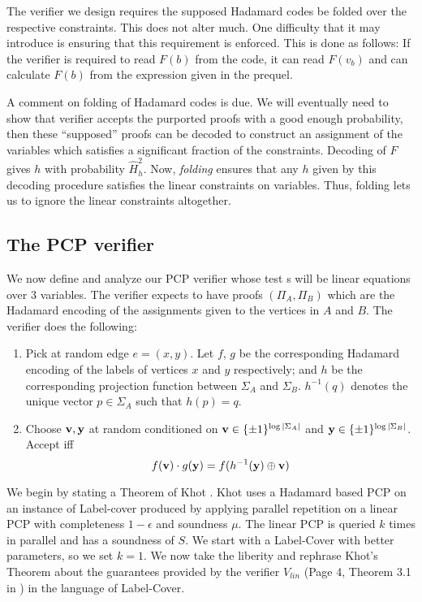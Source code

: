 The verifier we design requires the supposed Hadamard codes be folded
over the respective constraints. This does not alter much. One
difficulty that it may introduce is ensuring that this requirement is
enforced.  This is done as follows: If the verifier is required to
read $F(b)$ from the code, it can read $F(v_b)$ and can calculate
$F(b)$ from the expression given in the prequel.

A comment on folding of Hadamard codes is due. We will eventually need
to show that verifier accepts the purported proofs with a good enough
probability, then these ``supposed'' proofs can be decoded to
construct an assignment of the variables which satisfies a significant
fraction of the constraints. Decoding of $F$ gives $h$ with
probability $\widehat{H}^2_h$. Now, {\em folding} ensures that any $h$
given by this decoding procedure satisfies the linear constraints on
variables. Thus, folding lets us to ignore the linear constraints 
altogether.

\subsection{The PCP verifier}
We now define and analyze our PCP verifier whose test
s will be linear equations over $3$ 
variables. The verifier expects to have
proofs $(\Pi_A, \Pi_B)$ which are the Hadamard encoding of the assignments
given to the vertices in $A$ and $B$. The verifier does the following:
\begin{enumerate}
\item Pick at random edge $e = (x,y)$. Let $f$, $g$ be the corresponding
 Hadamard encoding of the labels of vertices $x$ and $y$ respectively; 
  and $h$ be the corresponding projection function between $\Sigma_A$ and $\Sigma_B$.
$h^{-1}(q)$ denotes the unique vector $p \in \Sigma_A$ such that $h(p)  = q$. 

\item Choose ${\bf v,y}$ at random conditioned on ${\bf v} \in \{\pm 1\}^{\log |\Sigma_A|}$ 
and ${\bf y} \in \{\pm 1\}^{\log |\Sigma_B|}$. Accept iff 
\[
           f({\bf v}) \cdot g({\bf y}) = f(h^{-1}({\bf y}) \oplus {\bf v})
\]
\end{enumerate}

We begin by stating a Theorem of Khot \cite{Khot01}. Khot uses a
Hadamard based PCP on an instance of {\sc Label-cover} produced by
applying parallel repetition on a linear PCP with completeness $1 -
\epsilon$ and soundness $\mu$. The linear PCP is queried $k$ times in
parallel and has a soundness of $S$. We start with a {\sc Label-Cover} with 
better parameters, so we set $k = 1$. We now take the liberity and rephrase 
Khot's Theorem about the guarantees provided by the verifier $V_{lin}$ 
(Page 4, Theorem 3.1 in \cite{Khot01}) in the language of {\sc Label-Cover}.


